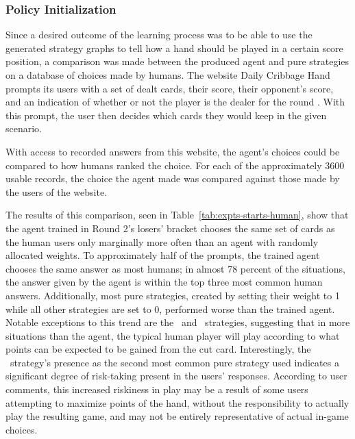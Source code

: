 

\subsubsection*{Policy Initialization}
\label{sec:findings-expts-starts}

Since a desired outcome of the learning process was to be able to use the
generated strategy graphs to tell how a hand should be played in a
certain score position,
a comparison was made between the produced agent and pure strategies
on a database of choices made by humans.
%
The website Daily Cribbage Hand
prompts its users with
a set of dealt cards,
their score,
their opponent's score,
and an indication of whether or not the player is the dealer for the round
\cite{dailycribbagehand}.
%
With this prompt,
the user then decides which cards they would
keep in the given scenario.

With access to recorded answers from this website,
the agent's choices could be compared
to how humans ranked the choice.
%
For each of the approximately 3600 usable records,
the choice the agent made was compared against those made by the users of the
website.

The results of this comparison,
seen in Table~\ref{tab:expts-starts-human},
show that the agent trained in Round 2's losers' bracket chooses the same
set of cards as the human users only marginally more often than an agent with 
randomly allocated weights.
%
To approximately half of the prompts,
the trained agent chooses the same answer as most humans;
in almost 78 percent of the situations,
the answer given by the agent is within the top three most common human answers.
%
Additionally,
most pure strategies,
created by setting their weight to 1 while all other strategies are set to 0,
performed worse than the trained agent.
%
Notable exceptions to this trend are the \handmaxposs\ and \handmaxavg\ 
strategies,
suggesting that in more situations than the agent,
the typical human player will play according to what points can be expected
to be gained from the cut card.
%
Interestingly,
the \handmaxposs\ strategy's presence as the second most common pure strategy
used indicates a significant degree of risk-taking present in the users'
responses.
%
According to user comments,
this increased riskiness in play
may be a result of some users attempting to maximize points of the hand,
without the responsibility to actually play the resulting game,
and may not be entirely representative of actual in-game choices.

